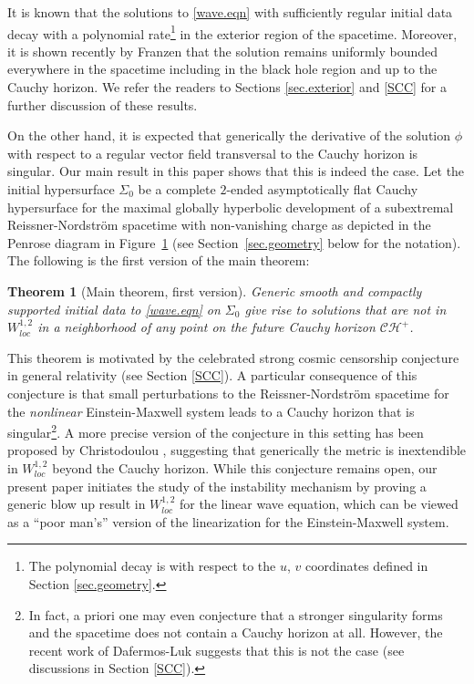 \documentclass[12 pt, reqno]{amsart}
\newtheorem{theorem}{Theorem}[section]
\theoremstyle{definition}
\theoremstyle{remark}
\numberwithin{equation}{section}
\newcommand{\0}{\emptyset}
\newcommand{\Sgm}{\Sigma}
\newcommand{\calC}{\mathcal C}
\newcommand{\calH}{\mathcal H}
\newcommand{\CH}{\calC \calH^{+}}		%
\begin{document}
It is known that the solutions to \eqref{wave.eqn} with sufficiently regular initial data decay with a polynomial rate\footnote{The polynomial decay is with respect to the $u$, $v$ coordinates defined in Section \ref{sec.geometry}.} in the exterior region of the spacetime. Moreover, it is shown recently by Franzen \cite{Fra} that the solution remains uniformly bounded everywhere in the spacetime including in the black hole region and up to the Cauchy horizon. We refer the readers to Sections \ref{sec.exterior} and \ref{SCC} for a further discussion of these results.

On the other hand, it is expected that generically the derivative of the solution $\phi$ with respect to a regular vector field transversal to the Cauchy horizon is singular. Our main result in this paper shows that this is indeed the case. Let the initial hypersurface $\Sgm_{0}$ be a complete $2$-ended asymptotically flat Cauchy hypersurface for the maximal globally hyperbolic development of a subextremal Reissner-Nordstr\"om spacetime with non-vanishing charge as depicted in the Penrose diagram in Figure~\ref{fig:main.thm} (see Section~\ref{sec.geometry} below for the notation). The following is the first version of the main theorem:
\begin{theorem}[Main theorem, first version]\label{main.thm}
Generic smooth and compactly supported initial data to \eqref{wave.eqn} on $\Sgm_{0}$ give rise to solutions that are not in $W^{1,2}_{loc}$ in a neighborhood of any point on the future Cauchy horizon $\CH$.
\end{theorem}
\begin{figure}[h]
\begin{center}
\def\svgwidth{200px}
 
\caption{} \label{fig:main.thm}
\end{center}
\end{figure}

This theorem is motivated by the celebrated strong cosmic censorship conjecture in general relativity (see Section \ref{SCC}). A particular consequence of this conjecture is that small perturbations to the Reissner-Nordstr\"om spacetime for the \emph{nonlinear} Einstein-Maxwell system leads to a Cauchy horizon that is singular\footnote{In fact, a priori one may even conjecture that a stronger singularity forms and the spacetime does not contain a Cauchy horizon at all. However, the recent work of Dafermos-Luk \cite{DL} suggests that this is not the case (see discussions in Section \ref{SCC}).}. A more precise version of the conjecture in this setting has been proposed by Christodoulou \cite{Chr}, suggesting that generically the metric is inextendible in $W^{1,2}_{loc}$ beyond the Cauchy horizon. While this conjecture remains open, our present paper initiates the study of the instability mechanism by proving a generic blow up result in $W^{1,2}_{loc}$ for the linear wave equation, which can be viewed as a ``poor man's'' version of the linearization for the Einstein-Maxwell system.
\end{document}

